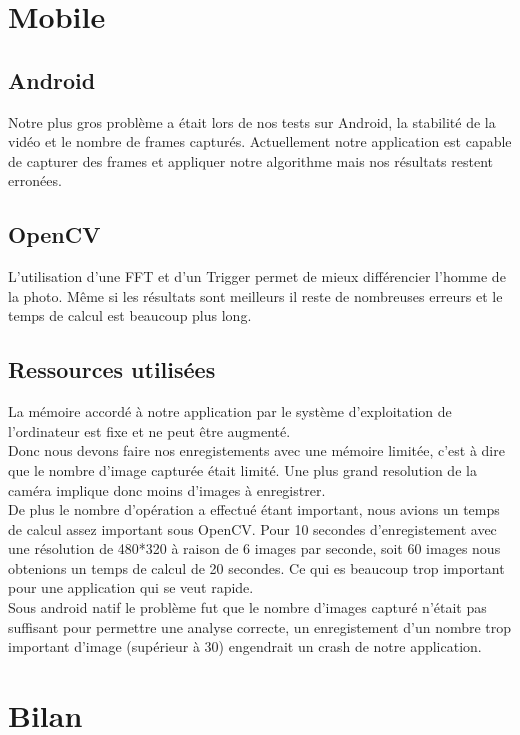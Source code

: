 \section{Mobile}

\subsection{Android}

Notre plus gros problème a était lors de nos tests sur Android, la stabilité de la vidéo et le nombre de frames capturés.
Actuellement notre application est capable de capturer des frames et appliquer notre algorithme mais nos résultats restent erronées.

\subsection{OpenCV}
L'utilisation d'une FFT et d'un Trigger permet de mieux différencier l'homme de la photo. Même si les résultats sont meilleurs il reste de nombreuses erreurs et le temps de calcul est beaucoup plus long.

\subsection{Ressources utilisées}
La mémoire accordé à notre application par le système d'exploitation de l'ordinateur est fixe et ne peut être augmenté.\\
Donc nous devons faire nos enregistements avec une mémoire limitée, c'est à dire que le nombre d'image capturée était limité. Une plus grand resolution de la caméra implique donc moins d'images à enregistrer. \\
De plus le nombre d'opération a effectué étant important, nous avions un temps de calcul assez important sous OpenCV\@. Pour 10 secondes d'enregistement avec une résolution de 480*320 à raison de 6 images par seconde, soit 60 images nous obtenions un temps de calcul de 20 secondes. Ce qui es beaucoup trop important pour une application qui se veut rapide.\\
Sous android natif le problème fut que le nombre d'images capturé n'était pas suffisant pour permettre une analyse correcte, un enregistement d'un nombre trop important d'image (supérieur à 30) engendrait un crash de notre application.



\section{Bilan}

